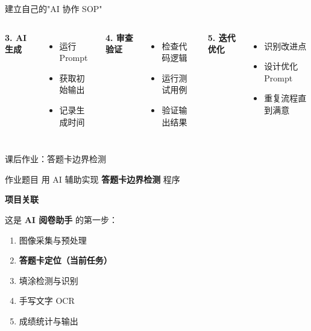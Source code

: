 \begin{frame}{建立自己的"AI 协作 SOP"}
\begin{columns}
		\textbf{3. AI 生成}
		\begin{itemize}
			\item 运行 Prompt
			\item 获取初始输出
			\item 记录生成时间
		\end{itemize}

		\textbf{4. 审查验证}
		\begin{itemize}
			\item 检查代码逻辑
			\item 运行测试用例
			\item 验证输出结果
		\end{itemize}

		\textbf{5. 迭代优化}
		\begin{itemize}
			\item 识别改进点
			\item 设计优化 Prompt
			\item 重复流程直到满意
		\end{itemize}
	\end{columns}
\end{frame}


\begin{frame}{课后作业：答题卡边界检测}
	\begin{block}{作业题目}
		用 AI 辅助实现 \textbf{答题卡边界检测} 程序
	\end{block}

	\vspace{0.3cm}

	\textbf{项目关联}

	这是 \textbf{AI 阅卷助手} 的第一步：
	\begin{enumerate}
		\item 图像采集与预处理
		\item \textbf{答题卡定位（当前任务）}
		\item 填涂检测与识别
		\item 手写文字 OCR
		\item 成绩统计与输出
	\end{enumerate}
\end{frame}

